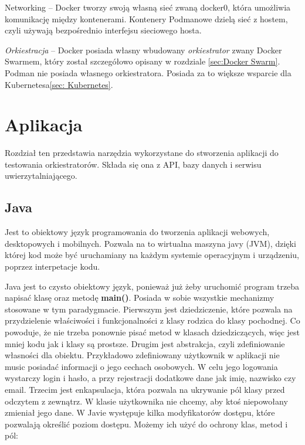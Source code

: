 \documentclass{iiuwb}
\begin{document}
Networking -- Docker tworzy swoją własną sieć zwaną docker0, która umożliwia komunikację między kontenerami. Kontenery Podmanowe dzielą sieć z hostem, czyli używają bezpośrednio interfejsu sieciowego hosta.
\newline

\textit{Orkiestracja} -- Docker posiada własny wbudowany \textit{orkiestrator} zwany Docker Swarmem, który został szczegółowo opisany w rozdziale \ref{sec:Docker Swarm}. Podman nie posiada własnego orkiestratora. Posiada za to większe wsparcie dla Kubernetesa\ref{sec: Kubernetes}.

\cleardoublepage
\chapter{Aplikacja}
\label{cha:Aplikacja}

Rozdział ten przedstawia narzędzia wykorzystane do stworzenia aplikacji do testowania orkiestratorów. Składa się ona z API, bazy danych i serwisu uwierzytalniającego. 

\section{Java}
\label{sec:Java}

Jest to obiektowy język programowania do tworzenia aplikacji webowych, desktopowych i mobilnych. Pozwala na to wirtualna maszyna javy (JVM), dzięki której kod może być uruchamiany na każdym systemie operacyjnym i urządzeniu, poprzez interpetacje kodu. 

Java jest to czysto obiektowy język, ponieważ już żeby uruchomić program trzeba napisać klasę oraz metodę \textbf{main()}. Posiada w sobie wszystkie mechanizmy stosowane w tym paradygmacie. 
Pierwszym jest dziedziczenie, które pozwala na przydzielenie właściwości i funkcjonalności z klasy rodzica do klasy pochodnej. Co powoduje, że nie trzeba ponownie pisać metod w klasach dziedziczących, więc jest mniej kodu jak i klasy są prostsze. 
Drugim jest abstrakcja, czyli zdefiniowanie własności dla obiektu. Przykładowo zdefiniowany użytkownik w aplikacji nie music posiadać informacji o jego cechach osobowych. W celu jego logowania wystarczy login i hasło, a przy rejestracji dodatkowe dane jak imię, nazwisko czy email.
Trzecim jest enkapsulacja, która pozwala na ukrywanie pól klasy przed odczytem z zewnątrz. W klasie użytkownika nie chcemy, aby ktoś niepowołany zmieniał jego dane. W Javie występuje kilka modyfikatorów dostępu, które pozwalają określić poziom dostępu. Możemy ich użyć do ochrony klas, metod i pól:
\end{document}
